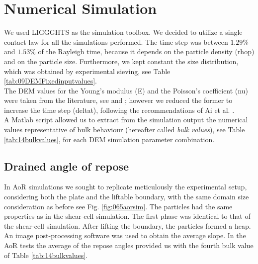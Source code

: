
\chapter{Numerical Simulation}
\label{cap:numericalsimulation}


We used \acs{LIGGGHTS} as the simulation toolbox.
We decided to utilize a single
contact law for all the simulations performed.
The time step was between $1.29 \%$ and $1.53 \%$ of the Rayleigh time, because
it depends on the particle density (\acs{rhop}) and on the particle size.
Furthermore, we kept constant the size distribution, which was obtained by
experimental sieving, see Table \ref{tab:09DEMFixedinputvalues}.\\
The \acs{DEM} values for the Young's modulus (\acs{E}) and the Poisson's
coefficient (\acs{nu}) were taken from the literature, see \cite{RefWorks:175} 
and \cite{RefWorks:176}; however we reduced the former to increase the time step
(\acs{deltat}), following the recommendations of Ai et al.
\cite{RefWorks:131}.\\
A Matlab script allowed us to extract from the simulation output the numerical
values representative of bulk behaviour (hereafter called \textit{bulk values}),
see Table \ref{tab:14bulkvalues},
for each \acs{DEM} simulation parameter combination.



\section{Drained angle of repose}
\label{sec:aorsim}

In \acs{AoR} simulations we sought to replicate meticulously the experimental setup, 
considering both the plate and the liftable boundary, with the same domain size consideration as before
see Fig. \ref{fig:065aorsim}. 
The particles had the same properties as in the shear-cell simulation. 
The first phase was identical to that of the shear-cell simulation. 
After lifting the boundary, the particles formed a heap.
An image post-processing software was used to obtain the average slope.
In the \acs{AoR} tests the average of the repose angles provided us with the fourth
bulk value of Table \ref{tab:14bulkvalues}.


